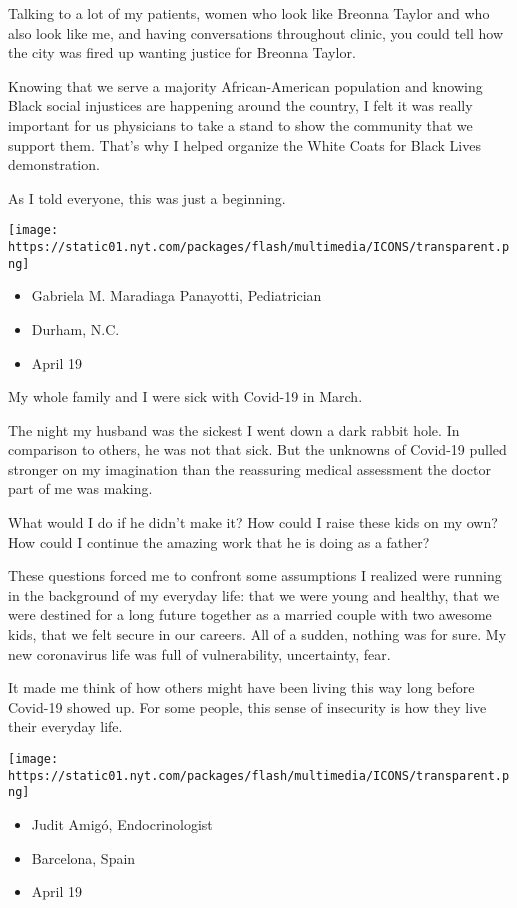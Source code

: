 Talking to a lot of my patients, women who look like Breonna Taylor and
who also look like me, and having conversations throughout clinic, you
could tell how the city was fired up wanting justice for Breonna Taylor.

Knowing that we serve a majority African-American population and knowing
Black social injustices are happening around the country, I felt it was
really important for us physicians to take a stand to show the community
that we support them. That's why I helped organize the White Coats for
Black Lives demonstration.

As I told everyone, this was just a beginning.

\texttt{[image: https://static01.nyt.com/packages/flash/multimedia/ICONS/transparent.png]}

\begin{itemize}
\tightlist
\item
  Gabriela M. Maradiaga Panayotti, Pediatrician
\item
  Durham, N.C.
\item
  April 19
\end{itemize}

My whole family and I were sick with Covid-19 in March.

The night my husband was the sickest I went down a dark rabbit hole. In
comparison to others, he was not that sick. But the unknowns of Covid-19
pulled stronger on my imagination than the reassuring medical assessment
the doctor part of me was making.

What would I do if he didn't make it? How could I raise these kids on my
own? How could I continue the amazing work that he is doing as a father?

These questions forced me to confront some assumptions I realized were
running in the background of my everyday life: that we were young and
healthy, that we were destined for a long future together as a married
couple with two awesome kids, that we felt secure in our careers. All of
a sudden, nothing was for sure. My new coronavirus life was full of
vulnerability, uncertainty, fear.

It made me think of how others might have been living this way long
before Covid-19 showed up. For some people, this sense of insecurity is
how they live their everyday life.

\texttt{[image: https://static01.nyt.com/packages/flash/multimedia/ICONS/transparent.png]}

\begin{itemize}
\tightlist
\item
  Judit Amigó, Endocrinologist
\item
  Barcelona, Spain
\item
  April 19
\end{itemize}

